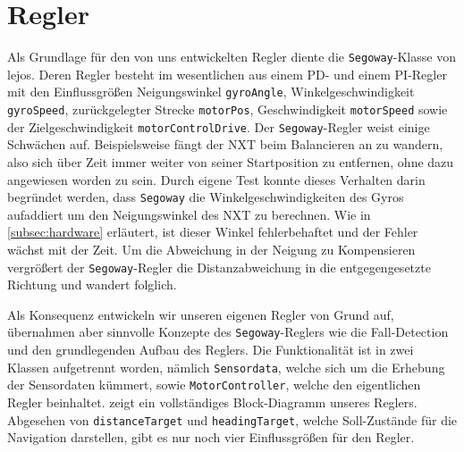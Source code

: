 \documentclass[oneside,abstractoff,a4paper]{scrartcl}
\begin{document}
\section{Regler}
\label{sec:Regler}
\begin{sloppypar}
Als Grundlage für den von uns entwickelten Regler diente die \texttt{Segoway}-Klasse von \ac{lejos}. Deren Regler besteht im wesentlichen aus einem PD- und einem PI-Regler mit den Einflussgrößen Neigungswinkel \texttt{gyroAngle}, Winkelgeschwindigkeit \texttt{gyroSpeed}, zurückgelegter Strecke  \texttt{motorPos}, Geschwindigkeit \texttt{motorSpeed} sowie der Zielgeschwindigkeit \texttt{motorControlDrive}.
Der \texttt{Segoway}-Regler weist einige Schwächen auf. Beispielsweise fängt der NXT beim Balancieren an zu \glqq wandern\grqq{}, also sich über Zeit immer weiter von seiner Startposition zu entfernen, ohne dazu angewiesen worden zu sein. 
Durch eigene Test konnte dieses Verhalten darin begründet werden, dass \texttt{Segoway} die Winkelgeschwindigkeiten des Gyros aufaddiert um den Neigungswinkel des NXT zu berechnen. Wie in \cref{subsec:hardware} erläutert, ist dieser Winkel fehlerbehaftet und der Fehler wächst mit der Zeit. Um die Abweichung in der Neigung zu Kompensieren vergrößert der \texttt{Segoway}-Regler die Distanzabweichung in die entgegengesetzte Richtung und \glqq wandert\grqq{} folglich.

Als Konsequenz entwickeln wir unseren eigenen Regler von Grund auf, übernahmen aber sinnvolle Konzepte des \texttt{Segoway}-Reglers wie die Fall-Detection und den grundlegenden Aufbau des Reglers. Die Funktionalität ist in zwei Klassen aufgetrennt worden, nämlich \texttt{Sensordata}, welche sich um die Erhebung der Sensordaten kümmert, sowie \texttt{MotorController}, welche den eigentlichen Regler beinhaltet.  zeigt ein vollständiges Block-Diagramm unseres Reglers. Abgesehen von \texttt{distanceTarget} und \texttt{headingTarget}, welche Soll-Zustände für die Navigation darstellen, gibt es nur noch vier Einflussgrößen für den Regler.

\begin{figure}
\end{figure}
\end{sloppypar}
\end{document}

